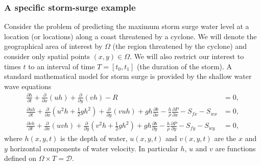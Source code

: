 

\subsubsection*{A specific storm-surge example}
Consider the problem of predicting the maximum 
storm surge water level at a location (or locations) along a coast threatened by a cyclone. We will denote the geographical area of interest by $\Omega$ 
(the region threatened by the cyclone) and consider only 
spatial points $(x,y) \in \Omega$. We will also restrict our interest to times $t$ to an interval of time $T = [t_0, t_1]$ (the duration of the storm). 
A standard mathematical model for storm surge is provided 
by the shallow water wave equations~\parencite{tan1992shallow}
\begin{subequations}
 \label{eqn:storm} 
\begin{align}
\frac{\partial h}{\partial t} +
\frac{\partial }{\partial x} \left(uh\right) + \frac{\partial }{\partial y} \left(vh\right) -R & =  0 ,\\
\frac{\partial uh}{\partial t} +
\frac{\partial }{\partial x} \left(u^2h +  \frac12 gh^2 \right) 
+ \frac{\partial }{\partial y} \left(vuh\right) + gh \frac{\partial b}{\partial x} 
- \frac{h}{\rho} \frac{\partial P}{\partial  x} - S_{fx} - S_{wx}  &= 0 ,   \\
\frac{\partial vh}{\partial t} +
\frac{\partial }{\partial x} \left(uvh  \right) 
+ \frac{\partial }{\partial y} \left(v^2h + \frac12 g h^2 \right) + gh \frac{\partial b}{\partial y} 
- \frac{h}{\rho} \frac{\partial P}{\partial  y} - S_{fy} -  S_{wy}& = 0,  
\end{align}
\end{subequations}
where $h(x,y,t)$ is the depth of water, $u(x,y,t)$ and $v(x,y,t)$ are the $x$ and $y$ horizontal components of water velocity. In particular $h$, $u$ and $v$ are functions defined on $\Omega \times T = \mathcal{D}$. 

